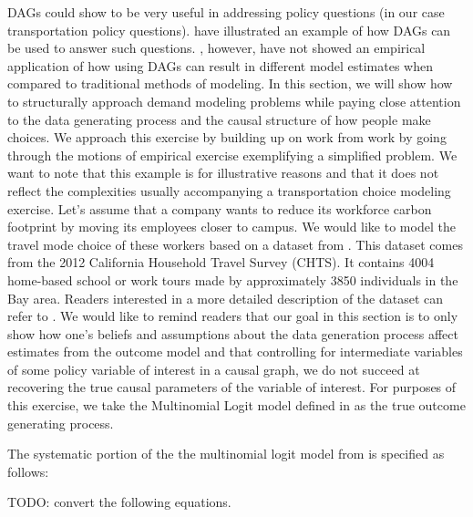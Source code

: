 DAGs could show to be very useful in addressing policy questions (in our case transportation policy questions).
\citet{brathwaite_2018_causal} have illustrated an example of how DAGs can be used to answer such questions.
\citet{brathwaite_2018_causal}, however, have not showed an empirical application of how using DAGs can result in
different model estimates when compared to traditional methods of modeling.
In this section, we will show how to structurally approach demand modeling problems while paying close
attention to the data generating process and the causal structure of how people make choices.
We approach this exercise by building up on work from \citet{brathwaite_2018_causal} work by going through
the motions of empirical exercise exemplifying a simplified problem.
We want to note that this example is for illustrative reasons and that it does not reflect the complexities
usually accompanying a transportation choice modeling exercise.
Let's assume that a company wants to reduce its workforce carbon footprint by moving its employees closer to campus.
We would like to model the travel mode choice of these workers based on a dataset from \citet{brathwaite-asymmetric}.
This dataset comes from the 2012 California Household Travel Survey (CHTS).
It contains 4004 home-based school or work tours made by approximately 3850 individuals in the Bay area.
Readers interested in a more detailed description of the dataset can refer to \citet{brathwaite-asymmetric}.
We would like to remind readers that our goal in this section is to only show how one's beliefs and assumptions about the data generation
process affect estimates from the outcome model and that controlling for intermediate variables of
some policy variable of interest in a causal graph,
we do not succeed at recovering the true causal parameters of the variable of interest.
For purposes of this exercise, we take the Multinomial Logit model defined in \citet{brathwaite-asymmetric} as the true outcome generating process.

The systematic portion of the the multinomial logit model from \citet{brathwaite-asymmetric} is specified as follows:

TODO: convert the following equations.

